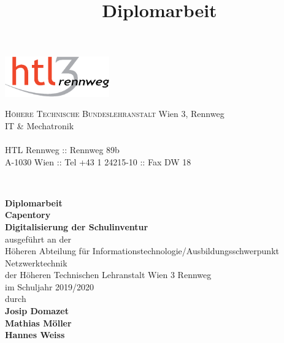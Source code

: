 \documentclass[
    headings=optiontotocandhead,%
    twoside,
    numbers=noenddot,%
    toc=flat, %
    12pt, %
    titlepage, %
    parskip=full, %
    listof=totoc, %
    listof=flat, %
    numbers=noenddot, %
    bibliography=totoc, %
    a4paper,DIV=14,
    BCOR=15mm,
]{scrbook}
\begin{document}
\newcommand{\kapitelautor}{}


\frontmatter %
\title{Diplomarbeit}
\begin{titlepage}
\begin{minipage}[b]{1\columnwidth}
\parbox[b]{50mm}{\includegraphics[width=45mm]{HTL3RLogoRGB}}
\hfill
\parbox[b]{130mm}{\footnotesize \textsc{Höhere Technische Bundeslehranstalt} Wien 3, Rennweg\\
IT \& Mechatronik\\
\\
HTL Rennweg :: Rennweg 89b\\
A-1030 Wien :: Tel +43 1 24215-10 :: Fax DW 18
}\\
\mbox{}
\end{minipage}

\vspace{1cm}


\begin{center}
\textbf{\LARGE{}Diplomarbeit}{\large{}}\\
{\large{}\vspace{15mm}
 }\textbf{\large{}Capentory}\\
\textbf{\large{}Digitalisierung der Schulinventur}\\
 \vspace{15mm}
 ausgeführt an der\\
 Höheren Abteilung für Informationstechnologie/Ausbildungsschwerpunkt Netzwerktechnik\\
 der Höheren Technischen Lehranstalt Wien 3 Rennweg\\
 \vspace{1cm}
 im Schuljahr 2019/2020\\
 \vspace{1cm}
 durch\\
 \vspace{0.5cm}
\textbf{\large{}Josip Domazet}\\
\textbf{\large{}Mathias Möller}\\
\textbf{\large{}Hannes Weiss}\\


\end{center}
\end{titlepage}
\end{document}
